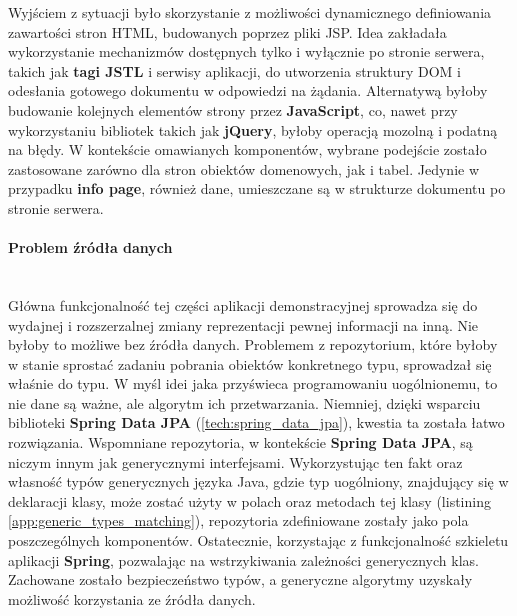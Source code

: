 	Wyjściem z sytuacji było skorzystanie z możliwości dynamicznego definiowania zawartości stron HTML, budowanych poprzez pliki JSP. Idea zakładała wykorzystanie mechanizmów dostępnych tylko i wyłącznie po stronie serwera, takich jak \textbf{tagi JSTL} i serwisy aplikacji, do utworzenia struktury DOM i odesłania gotowego dokumentu w odpowiedzi na żądania. Alternatywą byłoby budowanie kolejnych elementów strony przez \textbf{JavaScript}, co, nawet przy wykorzystaniu bibliotek takich jak \textbf{jQuery}, byłoby operacją mozolną i podatną na błędy. W kontekście omawianych komponentów, wybrane podejście zostało zastosowane zarówno dla stron obiektów domenowych, jak i tabel. Jedynie w przypadku \textbf{info page}, również dane, umieszczane są w strukturze dokumentu po stronie serwera. 
	
	\paragraph{Problem źródła danych} \hspace{0pt} \\
	Główna funkcjonalność tej części aplikacji demonstracyjnej sprowadza się do wydajnej i rozszerzalnej zmiany reprezentacji pewnej informacji na inną. Nie byłoby to możliwe bez źródła danych. Problemem z repozytorium, które byłoby w stanie sprostać zadaniu pobrania obiektów konkretnego typu, sprowadzał się właśnie do typu. W myśl idei jaka przyświeca programowaniu uogólnionemu, to nie dane są ważne, ale algorytm ich przetwarzania. Niemniej, dzięki wsparciu biblioteki \textbf{Spring Data JPA} (\ref{tech:spring_data_jpa}), kwestia ta została łatwo rozwiązania. Wspomniane repozytoria, w kontekście \textbf{Spring Data JPA}, są niczym innym jak generycznymi interfejsami. Wykorzystując ten fakt oraz własność typów generycznych języka Java, gdzie typ uogólniony, znajdujący się w deklaracji klasy, może zostać użyty w polach oraz metodach tej klasy (listining \ref{app:generic_types_matching}), repozytoria zdefiniowane zostały jako pola poszczególnych komponentów. Ostatecznie, korzystając z funkcjonalność szkieletu aplikacji \textbf{Spring}, pozwalając na wstrzykiwania zależności generycznych klas. Zachowane zostało bezpieczeństwo typów, a generyczne algorytmy uzyskały możliwość korzystania ze źródła danych.
